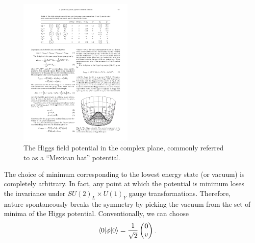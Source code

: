 \begin{figure}[!hbtp]
\centering
\includegraphics[width=0.5\textwidth]{Higgs_potential}
\caption[The Higgs field potential.]{The Higgs field potential in the complex plane, commonly referred to as a
``Mexican hat'' potential.}
\label{fig:higgs_potential}
\end{figure}

The choice of minimum corresponding to the lowest energy state (or vacuum) is completely arbitrary. In fact, any point
at which the potential is minimum loses the invariance under $SU(2)_L \times U(1)_Y$ gauge transformations. Therefore,
nature spontaneously breaks the symmetry by picking the vacuum from the set of minima of the Higgs potential.
Conventionally, we can choose
\begin{equation}
\langle 0 | \phi | 0 \rangle = \frac{1}{\sqrt{2}} \begin{pmatrix} 0 \\ v \end{pmatrix}.
\end{equation}

